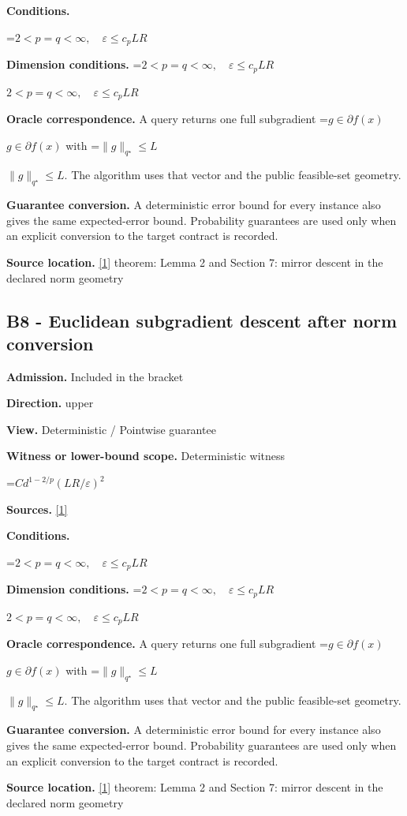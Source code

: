 \documentclass[10pt,a4paper]{article}
\newcommand{\AtlasMath}[1]{\par\begingroup\centering\setbox0=\hbox{$\displaystyle #1$}\ifdim\wd0>1.4\linewidth\typeout{ATLAS WIDE FORMULA: \the\wd0}\fi\ifdim\wd0>\linewidth\resizebox{\linewidth}{!}{\box0}\else\box0\fi\par\endgroup}
\newcommand{\AtlasInlineMath}[1]{\begingroup\setbox0=\hbox{$#1$}\ifdim\wd0>.4\linewidth\endgroup\AtlasMath{#1}\else\endgroup$#1$\fi}
\begin{document}
\textbf{Conditions.} 
\AtlasMath{2<p=q<\infty,\quad\varepsilon\le c_pLR}


\textbf{Dimension conditions.} \AtlasInlineMath{2<p=q<\infty,\quad\varepsilon\le c_pLR}

\textbf{Oracle correspondence.} A query returns one full subgradient \AtlasInlineMath{g\in\partial f(x)} with \AtlasInlineMath{\|g\|_{q^\star}\le L}. The algorithm uses that vector and the public feasible-set geometry.

\textbf{Guarantee conversion.} A deterministic error bound for every instance also gives the same expected-error bound. Probability guarantees are used only when an explicit conversion to the target contract is recorded.

\textbf{Source location.} \href{https://arxiv.org/pdf/1107.4080}{[1]} theorem: Lemma 2 and Section 7: mirror descent in the declared norm geometry

\subsection{B8 - Euclidean subgradient descent after norm conversion}
\textbf{Admission.} Included in the bracket

\textbf{Direction.} upper

\textbf{View.} Deterministic / Pointwise guarantee

\textbf{Witness or lower-bound scope.} Deterministic witness

\AtlasMath{C d^{1-2/p}(LR/\varepsilon)^2}
\textbf{Sources.} \href{https://arxiv.org/pdf/1107.4080}{[1]}

\textbf{Conditions.} 
\AtlasMath{2<p=q<\infty,\quad\varepsilon\le c_pLR}


\textbf{Dimension conditions.} \AtlasInlineMath{2<p=q<\infty,\quad\varepsilon\le c_pLR}

\textbf{Oracle correspondence.} A query returns one full subgradient \AtlasInlineMath{g\in\partial f(x)} with \AtlasInlineMath{\|g\|_{q^\star}\le L}. The algorithm uses that vector and the public feasible-set geometry.

\textbf{Guarantee conversion.} A deterministic error bound for every instance also gives the same expected-error bound. Probability guarantees are used only when an explicit conversion to the target contract is recorded.

\textbf{Source location.} \href{https://arxiv.org/pdf/1107.4080}{[1]} theorem: Lemma 2 and Section 7: mirror descent in the declared norm geometry
\end{document}
